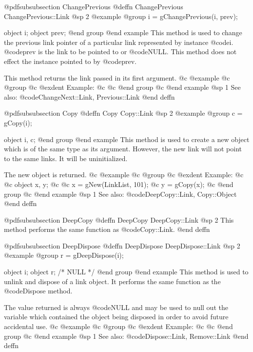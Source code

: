 @pdfsubsubsection {ChangePrevious}
@deffn {ChangePrevious} ChangePrevious::Link
@sp 2
@example
@group
i = gChangePrevious(i, prev);

object  i;
object  prev;
@end group
@end example
This method is used to change the previous link pointer of a particular
link represented by instance @code{i}.  @code{prev} is the link to be
pointed to or @code{NULL}.  This method does not effect the instance
pointed to by @code{prev}.

This method returns the link passed in its first argument.
@c @example
@c @group
@c @exdent Example:
@c 
@c @end group
@c @end example
@sp 1
See also:  @code{ChangeNext::Link, Previous::Link}
@end deffn







@pdfsubsubsection {Copy}
@deffn {Copy} Copy::Link
@sp 2
@example
@group
c = gCopy(i);

object  i, c;
@end group
@end example
This method is used to create a new object which is of the same type as
its argument.  However, the new link will not point to the same links.
It will be uninitialized.

The new object is returned.
@c @example
@c @group
@c @exdent Example:
@c 
@c object  x, y;
@c 
@c x = gNew(LinkList, 101);
@c y = gCopy(x);
@c @end group
@c @end example
@sp 1
See also:  @code{DeepCopy::Link, Copy::Object}
@end deffn










@pdfsubsubsection {DeepCopy}
@deffn {DeepCopy} DeepCopy::Link
@sp 2
This method performs the same function as @code{Copy::Link}.
@end deffn











@pdfsubsubsection {DeepDispose}
@deffn {DeepDispose} DeepDispose::Link
@sp 2
@example
@group
r = gDeepDispose(i);

object  i;
object  r;     /*  NULL  */
@end group
@end example
This method is used to unlink and dispose of a link object.
It performs the same function as the @code{Dispose} method.

The value returned is always @code{NULL} and may be used to null out
the variable which contained the object being disposed in order to
avoid future accidental use.
@c @example
@c @group
@c @exdent Example:
@c 
@c @end group
@c @end example
@sp 1
See also:  @code{Dispose::Link, Remove::Link}
@end deffn










